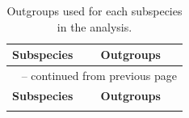 \begin{center}
    \footnotesize
    \renewcommand{\arraystretch}{1.15}

    \begin{longtable}{p{} p{}}
        \toprule
        \textbf{Subspecies} & \textbf{Outgroups} \\
        \midrule
        \endfirsthead
        \multicolumn{2}{c}{\tablename~\thetable{} -- continued from previous page} \\
        \toprule
        \textbf{Subspecies} & \textbf{Outgroups} \\
        \midrule
        \endhead
        \bottomrule
        \addlinespace[2ex]
        \rowcolor{white}\caption{Outgroups used for each subspecies in the analysis.}\label{tab:outgroups}
        \endlastfoot


\end{longtable}
\end{center}
